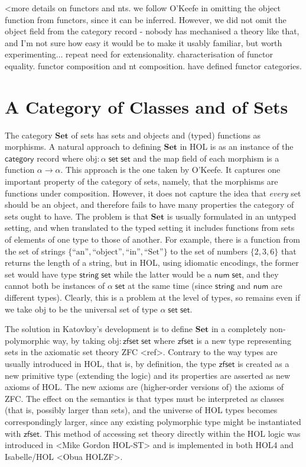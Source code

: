 \documentclass[twoside,titlepage,11pt]{article}
\begin{document}
<more details on functors and nts. we follow O'Keefe in omitting the object function from functors, since it can be inferred. However, we did not omit the object field from the category record - nobody has mechanised a theory like that, and I'm not sure how easy it would be to make it usably familiar, but worth experimenting...
repeat need for extensionality. characterisation of functor equality. functor composition and nt composition. have defined functor categories.
\section{A Category of Classes and of Sets}%
\newcommand{\Set}{\ensuremath{\mathbf{Set}}}
The category $\Set$ of sets has sets and objects and (typed) functions as morphisms.
A natural approach to defining $\Set$ in HOL is as an instance of the $\mathsf{category}$ record where $\mathrm{obj}:\alpha\;\mathsf{set}\;\mathsf{set}$ and the map field of each morphism is a function $\alpha\to\alpha$.
This approach is the one taken by O'Keefe.
It captures one important property of the category of sets, namely, that the morphisms are functions under composition.
However, it does not capture the idea that \emph{every} set should be an object, and therefore fails to have many properties the category of sets ought to have.
The problem is that $\Set$ is usually formulated in an untyped setting, and when translated to the typed setting it includes functions from sets of elements of one type to those of another.
For example, there is a function from the set of strings $\{\text{``an''},\text{``object''},\text{``in''},\text{``Set''}\}$ to the set of numbers $\{2,3,6\}$ that returns the length of a string, but in HOL, using idiomatic encodings, the former set would have type $\mathsf{string}\;\mathsf{set}$ while the latter would be a $\mathsf{num}\;\mathsf{set}$, and they cannot both be instances of $\alpha\;\mathsf{set}$ at the same time (since $\mathsf{string}$ and $\mathsf{num}$ are different types).
Clearly, this is a problem at the level of types, so remains even if we take $\mathrm{obj}$ to be the universal set of type $\alpha\;\mathsf{set}\;\mathsf{set}$.

The solution in Katovksy's development is to define $\Set$ in a completely non-polymorphic way, by taking $\mathrm{obj}:\mathsf{zfset}\;\mathsf{set}$ where $\mathsf{zfset}$ is a new type representing sets in the axiomatic set theory ZFC <ref>.
Contrary to the way types are usually introduced in HOL, that is, by definition, the type $\mathsf{zfset}$ is created as a new primitive type (extending the logic) and its properties are asserted as new axioms of HOL.
The new axioms are (higher-order versions of) the axioms of ZFC.
The effect on the semantics is that types must be interpreted as classes (that is, possibly larger than sets), and the universe of HOL types becomes correspondingly larger, since any existing polymorphic type might be instantiated with $\mathsf{zfset}$.
This method of accessing set theory directly within the HOL logic was introduced in <Mike Gordon HOL-ST> and is implemented in both HOL4 and Isabelle/HOL <Obua HOLZF>.
\end{document}
